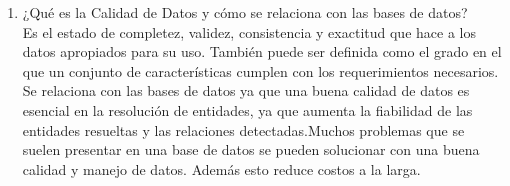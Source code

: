 \documentclass[12pt]{article}
\begin{document}
\begin{enumerate}
      \item ¿Qué es la Calidad de Datos y cómo se relaciona con las
      bases de datos?\\
      Es  el estado de completez, validez, consistencia y exactitud
      que hace a los datos apropiados para su uso. También puede ser
      definida como el grado en el que un conjunto de características
      cumplen con los requerimientos necesarios.
      Se relaciona con las bases de datos ya que una buena calidad de
      datos es esencial en la resolución de entidades, ya que aumenta la fiabilidad de las entidades resueltas y las relaciones 
      detectadas.Muchos problemas que se suelen presentar en una base
      de datos se pueden solucionar con una buena calidad y manejo 
      de datos. Además esto reduce costos a la larga.
      
      
	   	
 \end{enumerate}
\end{document}
